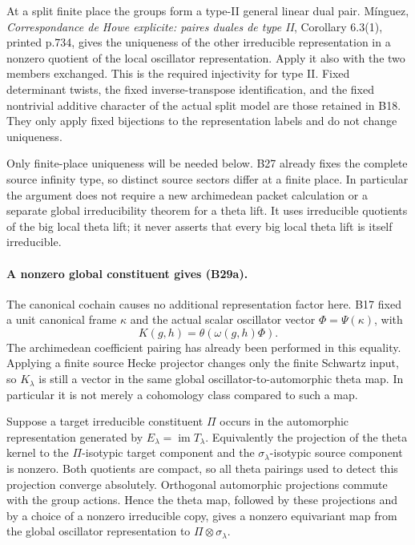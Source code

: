 At a split finite place the groups form a type-II general
linear dual pair.  M\'inguez,
\emph{Correspondance de Howe explicite: paires duales de
type II}, Corollary 6.3(1), printed p.734, gives the
uniqueness of the other irreducible representation in
a nonzero quotient of the local oscillator representation.
Apply it also with the two members exchanged.  This is
the required injectivity for type II.  Fixed determinant
twists, the fixed inverse-transpose identification, and
the fixed nontrivial additive character of the actual
split model are those retained in B18.  They only apply
fixed bijections to the representation labels and do
not change uniqueness.

Only finite-place uniqueness will be needed below.
B27 already fixes the complete source infinity type,
so distinct source sectors differ at a finite place.
In particular the argument does not require a new
archimedean packet calculation or a separate global
irreducibility theorem for a theta lift.  It uses
irreducible quotients of the big local theta lift;
it never asserts that every big local theta lift is
itself irreducible.

\paragraph{A nonzero global constituent gives (B29a).}
The canonical cochain causes no additional representation
factor here.  B17 fixed a unit canonical frame $\kappa$
and the actual scalar oscillator vector
$\Phi=\Psi(\kappa)$, with
\[
   K(g,h)=\theta(\omega(g,h)\Phi).
 \tag{B29b}
\]
The archimedean coefficient pairing has already been
performed in this equality.  Applying a finite source
Hecke projector changes only the finite Schwartz input,
so $K_\lambda$ is still a vector in the same global
oscillator-to-automorphic theta map.  In particular it
is not merely a cohomology class compared to such a map.

Suppose a target irreducible constituent $\Pi$ occurs
in the automorphic representation generated by
$E_\lambda=\operatorname{im}T_\lambda$.
Equivalently the projection of the theta kernel to
the $\Pi$-isotypic target component and the
$\sigma_\lambda$-isotypic source component is nonzero.
Both quotients are compact, so all theta pairings used
to detect this projection converge absolutely.
Orthogonal automorphic projections commute with the
group actions.  Hence the theta map, followed by these
projections and by a choice of a nonzero irreducible
copy, gives a nonzero equivariant map from the global
oscillator representation to $\Pi\otimes\sigma_\lambda$.

